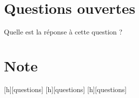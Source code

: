 \documentclass{exam}
\begin{document}
\section{Questions ouvertes}

\begin{questions}
\setcounter{question}{0}

\question[1]
Quelle est la réponse à cette question ?
\fillwithdottedlines{1in}

\end{questions}


\section{Note}
\begin{center}
[h][questions]
[h][questions]
[h][questions]
\end{center}
\end{document}
